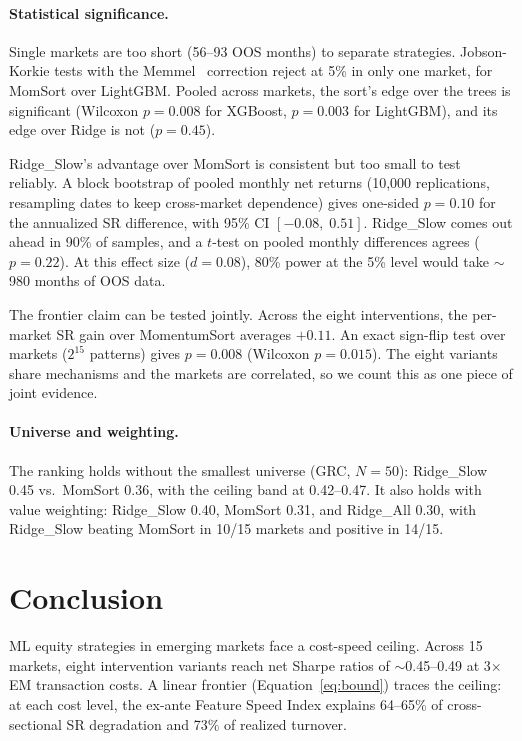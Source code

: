 \documentclass[sigconf,balance=false]{acmart}
\begin{document}
\paragraph{Statistical significance.}
Single markets are too short (56--93 OOS months) to separate
strategies. Jobson-Korkie tests with the
Memmel~\cite{memmel2003performance} correction reject at 5\% in only
one market, for MomSort over LightGBM. Pooled across markets, the
sort's edge over the trees is significant (Wilcoxon $p = 0.008$ for
XGBoost, $p = 0.003$ for LightGBM), and its edge over Ridge is not
($p = 0.45$).

Ridge\_Slow's advantage over MomSort is consistent but too small to
test reliably. A block bootstrap of pooled monthly net returns
(10{,}000 replications, resampling dates to keep cross-market
dependence) gives one-sided $p = 0.10$ for the annualized SR
difference, with 95\% CI $[-0.08,\; 0.51]$. Ridge\_Slow comes out
ahead in 90\% of samples, and a $t$-test on pooled monthly
differences agrees ($p = 0.22$). At this effect size ($d = 0.08$),
80\% power at the 5\% level would take ${\sim}$980 months of OOS data.

The frontier claim can be tested jointly. Across the eight
interventions, the per-market SR gain over MomentumSort averages
$+0.11$. An exact sign-flip test over markets ($2^{15}$ patterns)
gives $p = 0.008$ (Wilcoxon $p = 0.015$). The eight variants share
mechanisms and the markets are correlated, so we count this as one
piece of joint evidence.

\paragraph{Universe and weighting.}
The ranking holds without the smallest universe (GRC, $N = 50$):
Ridge\_Slow 0.45 vs.\ MomSort 0.36, with the ceiling band at
0.42--0.47. It also holds with value weighting: Ridge\_Slow 0.40,
MomSort 0.31, and Ridge\_All 0.30, with Ridge\_Slow beating MomSort in
10/15 markets and positive in 14/15.


\section{Conclusion}

ML equity strategies in emerging markets face a cost-speed ceiling.
Across 15 markets, eight intervention variants reach net Sharpe ratios
of ${\sim}$0.45--0.49 at 3$\times$ EM transaction costs. A linear
frontier (Equation~\ref{eq:bound}) traces the ceiling: at each cost
level, the ex-ante Feature Speed Index explains 64--65\% of
cross-sectional SR degradation and 73\% of realized turnover.
\end{document}

